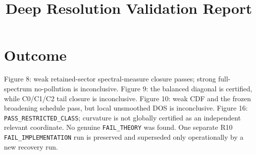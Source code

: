 \documentclass[11pt]{article}
\title{Deep Resolution Validation Report}\date{}
\begin{document}
\maketitle
\section*{Outcome}
Figure 8: weak retained-sector spectral-measure closure passes; strong full-spectrum no-pollution is inconclusive.
Figure 9: the balanced diagonal is certified, while C0/C1/C2 tail closure is inconclusive.
Figure 10: weak CDF and the frozen broadening schedule pass, but local unsmoothed DOS is inconclusive.
Figure 16: \texttt{PASS\_RESTRICTED\_CLASS}; curvature is not globally certified as an independent relevant coordinate.
No genuine \texttt{FAIL\_THEORY} was found.  One separate R10 \texttt{FAIL\_IMPLEMENTATION} run is preserved and superseded only operationally by a new recovery run.
\end{document}
